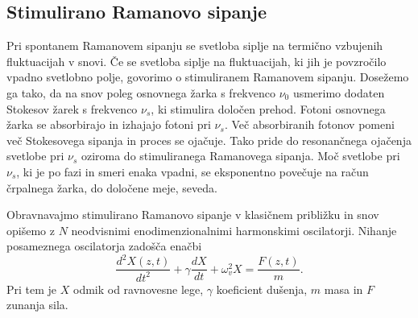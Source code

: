\subsection*{Stimulirano Ramanovo sipanje}
Pri spontanem Ramanovem sipanju se svetloba siplje na termično vzbujenih fluktuacijah
v snovi. Če se svetloba siplje na fluktuacijah, ki jih je povzročilo vpadno
svetlobno polje, govorimo o stimuliranem Ramanovem sipanju. Dosežemo ga tako,
da na snov poleg osnovnega žarka s frekvenco $\nu_0$ usmerimo dodaten Stokesov 
žarek s frekvenco $\nu_s$, ki stimulira določen prehod. Fotoni 
osnovnega žarka se absorbirajo in izhajajo fotoni pri $\nu_s$. Več absorbiranih fotonov
pomeni več Stokesovega sipanja in proces se ojačuje. Tako pride do 
resonančnega ojačenja svetlobe pri $\nu_s$ oziroma do stimuliranega 
Ramanovega sipanja. Moč svetlobe pri $\nu_s$, ki je po fazi in smeri enaka vpadni, 
se eksponentno povečuje na račun črpalnega žarka, do določene meje, seveda.

Obravnavajmo stimulirano Ramanovo sipanje v klasičnem približku in snov opišemo 
z $N$ neodvisnimi enodimenzionalnimi harmonskimi oscilatorji. Nihanje
posameznega oscilatorja zadošča enačbi
\begin{equation}
\frac{d^2X(z,t)}{dt^2}+ \gamma \frac{dX}{dt}+\omega_v^2X = \frac{F(z,t)}{m}.
\label{srs:X}
\end{equation}
Pri tem je $X$ odmik od ravnovesne lege, $\gamma$ koeficient dušenja, $m$ masa in $F$ zunanja sila.

